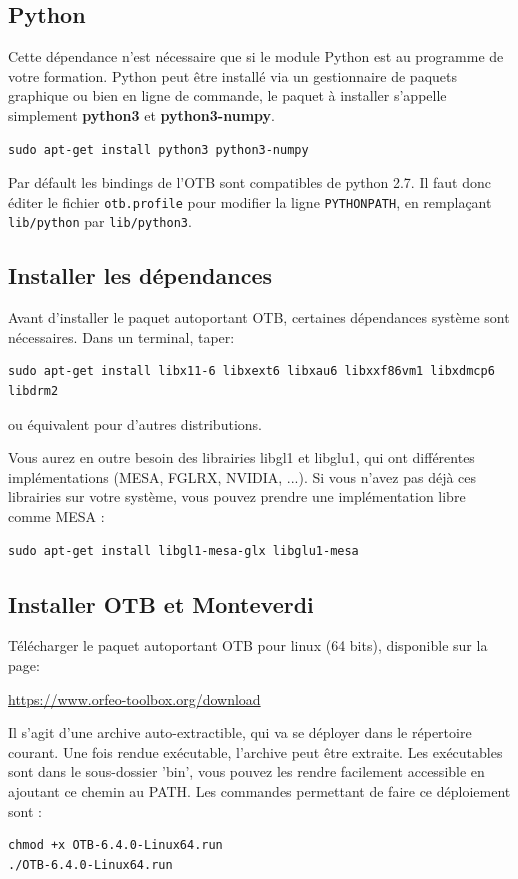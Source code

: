 \documentclass[10pt,a4paper]{article}
\begin{document}
\subsection{Python}
Cette dépendance n'est nécessaire que si le module Python est au programme de votre formation.
Python peut être installé via un gestionnaire de paquets graphique ou bien en
ligne de commande, le paquet à installer s'appelle simplement \textbf{python3} et \textbf{python3-numpy}.
\begin{verbatim}
sudo apt-get install python3 python3-numpy
\end{verbatim}

Par défault les bindings de l'OTB sont compatibles de python 2.7. Il faut donc éditer le fichier \verb?otb.profile? pour modifier la ligne \verb?PYTHONPATH?, en remplaçant \verb?lib/python? par \verb?lib/python3?.

\subsection{Installer les dépendances}
Avant d'installer le paquet autoportant OTB, certaines dépendances système
sont nécessaires. Dans un terminal, taper:
\begin{verbatim}
sudo apt-get install libx11-6 libxext6 libxau6 libxxf86vm1 libxdmcp6 libdrm2
\end{verbatim}
ou équivalent pour d'autres distributions.

Vous aurez en outre besoin des librairies libgl1 et libglu1, qui ont
différentes implémentations (MESA, FGLRX, NVIDIA, ...). Si vous n'avez pas
déjà ces librairies sur votre système, vous pouvez prendre une implémentation
libre comme MESA :
\begin{verbatim}
sudo apt-get install libgl1-mesa-glx libglu1-mesa
\end{verbatim}

\subsection{Installer OTB et Monteverdi}
Télécharger le paquet autoportant OTB pour linux (64 bits), disponible sur la
page:
\begin{center}
\url{https://www.orfeo-toolbox.org/download}
\end{center}

Il s'agit d'une archive auto-extractible, qui va se déployer dans le répertoire
courant. Une fois rendue exécutable, l'archive peut être extraite. Les
exécutables sont dans le sous-dossier 'bin', vous pouvez les rendre facilement
accessible en ajoutant ce chemin au PATH. Les commandes permettant de faire
ce déploiement sont :
\begin{verbatim}
chmod +x OTB-6.4.0-Linux64.run
./OTB-6.4.0-Linux64.run
\end{verbatim}
\end{document}
